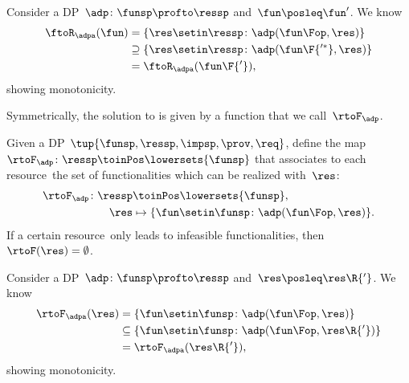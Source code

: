 \begin{remark}[Monotonicity]
    Consider a DP~$\adp\colon\funsp\profto\ressp$ and~$\fun\posleq \fun'$.
    We know
    \begin{equation*}
        \begin{aligned}
            \ftoR_\adpa(\fun) & =\{ \res \setin \ressp \colon \adp(\fun\Fop, \res)\} \\
                              & \supseteq \{ \res \setin \ressp \colon \adp(\fun\F{'^*}, \res)\} \\
                              & =\ftoR_\adpa(\fun\F{'}),
        \end{aligned}
    \end{equation*}
    showing monotonicity.
\end{remark}

Symmetrically, the solution to \FixResMaxFun is given by a function that we call~$\rtoF_\adp$.

\begin{definition}
    \label{def:rtoF-dp}
    Given a DP~$\tup{ \funsp,\ressp,\impsp,\prov,\req}$, define the map~$\rtoF_{\adp}\colon \ressp\toinPos  \lowersets{\funsp}$ that associates to each resource~\res the set of functionalities which can be realized with~$\res$:
    \begin{equation*}
        \begin{aligned}
            \rtoF_{\adp}\colon \ressp & \toinPos \lowersets{\funsp}, \\
            \res                      & \mapsto \{ \fun \setin \funsp \colon \adp(\fun\Fop, \res)\}.
        \end{aligned}
    \end{equation*}
    If a certain resource~\res only leads to infeasible functionalities, then~$\rtoF(\res)=\emptyset$.
\end{definition}

\begin{remark}[Monotonicity]
    Consider a DP~$\adp\colon\funsp\profto\ressp$ and~$\res\posleq \res\R{'}$.
    We know
    \begin{equation*}
        \begin{aligned}
            \rtoF_\adpa(\res) & =\{ \fun \setin \funsp \colon \adp(\fun\Fop, \res)\} \\
                              & \subseteq \{ \fun \setin \funsp \colon \adp(\fun\Fop, \res\R{'})\} \\
                              & =\rtoF_\adpa(\res\R{'}),
        \end{aligned}
    \end{equation*}
    showing monotonicity.
\end{remark}

